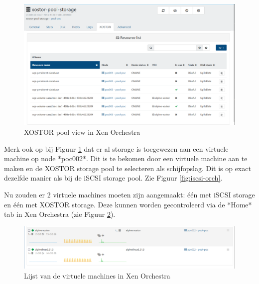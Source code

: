\begin{figure}[H]
  \centering
  \includegraphics[width=1.0\textwidth, trim=0cm 0cm 13cm 0cm, clip]{../poc/xostor-vieuw-orch.png}
  \caption{XOSTOR pool view in Xen Orchestra}
  \label{fig:xostor-pool-orch}    
\end{figure}

Merk ook op bij Figuur \ref{fig:xostor-pool-orch} dat er al storage is toegewezen aan een virtuele machine op node *poc002*.  
Dit is te bekomen door een virtuele machine aan te maken en de XOSTOR storage pool te selecteren als schijfopslag.  
Dit is op exact dezelfde manier als bij de iSCSI storage pool. Zie Figuur \ref{fig:iscsi-orch}.

Nu zouden er 2 virtuele machines moeten zijn aangemaakt: één met iSCSI storage en één met XOSTOR storage.  
Deze kunnen worden gecontroleerd via de *Home* tab in Xen Orchestra (zie Figuur \ref{fig:virtuelemachines-orch}).

\begin{figure}[H]
  \centering
  \includegraphics[width=1.0\textwidth, trim=0cm 0cm 17cm 0cm, clip]{../poc/virtuelemachines-orch.png}
  \caption{Lijst van de virtuele machines in Xen Orchestra}
  \label{fig:virtuelemachines-orch}  
\end{figure}

